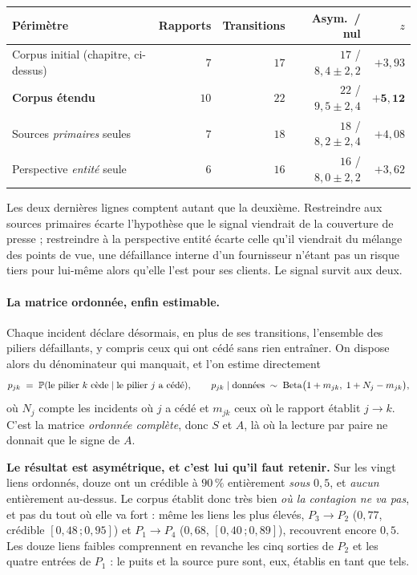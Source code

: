 \begin{center}\small
\renewcommand{\arraystretch}{1.25}
\begin{tabular}{@{}l r r r r@{}}
\toprule
\textbf{Périmètre} & \textbf{Rapports} & \textbf{Transitions} & \textbf{Asym.\ / nul} & $z$ \\
\midrule
Corpus initial (chapitre, ci-dessus) & $7$ & $17$ & $17$ / $8{,}4\pm2{,}2$ & $+3{,}93$ \\
\textbf{Corpus étendu} & $10$ & $22$ & $22$ / $9{,}5\pm2{,}4$ & $\mathbf{+5{,}12}$ \\
Sources \emph{primaires} seules & $7$ & $18$ & $18$ / $8{,}2\pm2{,}4$ & $+4{,}08$ \\
Perspective \emph{entité} seule & $6$ & $16$ & $16$ / $8{,}0\pm2{,}2$ & $+3{,}62$ \\
\bottomrule
\end{tabular}
\end{center}

\vspace{2pt}
Les deux dernières lignes comptent autant que la deuxième. Restreindre aux sources
primaires écarte l'hypothèse que le signal viendrait de la couverture de presse ; restreindre à
la perspective entité écarte celle qu'il viendrait du mélange des points de vue, une
défaillance interne d'un fournisseur n'étant pas un risque tiers pour lui-même alors qu'elle
l'est pour ses clients. Le signal survit aux deux.

\paragraph{La matrice ordonnée, enfin estimable.} Chaque incident déclare désormais, en plus de
ses transitions, l'ensemble des piliers défaillants, y compris ceux qui ont cédé sans
rien entraîner. On dispose alors du dénominateur qui manquait, et l'on estime directement
\begin{equation}
  p_{jk} \;=\; \mathbb{P}(\text{le pilier } k \text{ cède} \mid \text{le pilier } j \text{ a cédé}),
  \qquad
  p_{jk}\mid\text{données} \;\sim\; \mathrm{Beta}\bigl(1+m_{jk},\;1+N_j-m_{jk}\bigr),
  \label{eq:pjk}
\end{equation}
où $N_j$ compte les incidents où $j$ a cédé et $m_{jk}$ ceux où le rapport établit $j\to k$.
C'est la matrice \emph{ordonnée complète}, donc $S$ et $A$, là où la lecture par paire
ne donnait que le signe de $A$.

\begin{attention}
\textbf{Le résultat est asymétrique, et c'est lui qu'il faut retenir.} Sur les vingt liens
ordonnés, douze ont un crédible à $90\,\%$ entièrement \emph{sous} $0{,}5$, et
\emph{aucun} entièrement au-dessus. Le corpus établit donc très bien \emph{où la contagion ne
va pas}, et pas du tout où elle va fort : même les liens les plus élevés, $P_3\to P_2$
($0{,}77$, crédible $[0{,}48\,;0{,}95]$) et $P_1\to P_4$ ($0{,}68$, $[0{,}40\,;0{,}89]$),
recouvrent encore $0{,}5$. Les douze liens faibles comprennent en revanche les cinq
sorties de $P_2$ et les quatre entrées de $P_1$ : le puits et la source pure sont,
eux, établis en tant que tels.
\end{attention}

